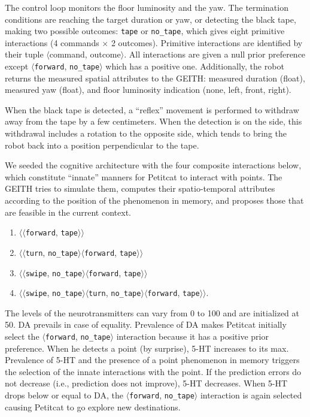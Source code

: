 \documentclass[runningheads]{llncs}
\begin{document}
The control loop monitors the floor luminosity and the yaw. %
The termination conditions are reaching the target duration or yaw, or detecting the black tape, making two possible outcomes: \texttt{tape} or \texttt{no\_tape}, which gives eight primitive interactions (4 commands $\times$ 2 outcomes).
Primitive interactions are identified by their tuple $\langle$command, outcome$\rangle$.
All interactions are given a null prior preference except $\langle$\texttt{forward}, \texttt{no\_tape}$\rangle$ which has a positive one.
Additionally, the robot returns the measured spatial attributes to the GEITH: measured duration (float), measured yaw (float), and floor luminosity indication (none, left, front, right). 

When the black tape is detected, a ``reflex'' movement is performed to withdraw away from the tape by a few centimeters. 
When the detection is on the side, this withdrawal includes a rotation to the opposite side, which tends to bring the robot back into a position perpendicular to the tape.

We seeded the cognitive architecture with the four composite interactions below, which constitute ``innate'' manners for Petitcat to interact with points. 
The GEITH tries to simulate them, computes their spatio-temporal attributes according to the position of the phenomenon in memory, and proposes those that are feasible in the current context.
\begin{enumerate}
	\item $\langle\langle$\texttt{forward}, \texttt{tape}$\rangle\rangle$
	\item $\langle\langle$\texttt{turn}, \texttt{no\_tape}$\rangle\langle$\texttt{forward}, \texttt{tape}$\rangle\rangle$
	\item $\langle\langle$\texttt{swipe}, \texttt{no\_tape}$\rangle\langle$\texttt{forward}, \texttt{tape}$\rangle\rangle$
	\item $\langle\langle$\texttt{swipe}, \texttt{no\_tape}$\rangle\langle$\texttt{turn}, \texttt{no\_tape}$\rangle\langle$\texttt{forward}, \texttt{tape}$\rangle\rangle$. 
\end{enumerate}

The levels of the neurotransmitters can vary from 0 to 100 and are initialized at 50. DA prevails in case of equality.
Prevalence of DA makes Petitcat initially select the $\langle$\texttt{forward}, \texttt{no\_tape}$\rangle$ interaction because it has a positive prior preference.
When he detects a point (by surprise), 5-HT increases to its max. 
Prevalence of 5-HT and the presence of a point phenomenon in memory triggers the selection of the innate interactions with the point.
If the prediction errors do not decrease (i.e., prediction does not improve), 5-HT decreases.
When 5-HT drops below or equal to DA, the  $\langle$\texttt{forward}, \texttt{no\_tape}$\rangle$ interaction is again selected causing Petitcat to go explore new destinations. 
\end{document}
